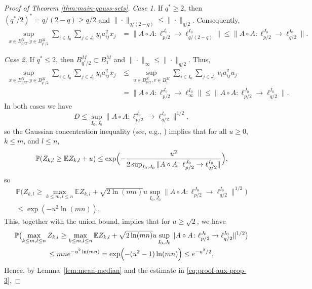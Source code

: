 \documentclass[a4paper]{amsart}
\theoremstyle{definition}
\theoremstyle{remark}
\numberwithin{equation}{section}
\newcommand*{\EE}{\mathbb{E}}
\newcommand*{\PP}{\mathbb{P}}
\newcommand*{\hadprod}{\mathbin{\circ}} %
\begin{document}
\begin{proof}[Proof of Theorem \ref{thm:main-gauss-sets}]
\textit{Case 1.} If $q^*\geq 2$, then $(q^*/2)^* = q/(2-q)\geq q/2$ and $\|\cdot\|_{q/(2-q)} \leq \|\cdot\|_{q/2}$.
Consequently,
\begin{align}	\label{eq:manipulations-to-fix1} 
\sup_{x\in B_{p/2}^N, y\in B_{q^*/2}^M} \sum_{i\in I_0} \sum_{j\in J_0}  y_i a_{ij}^2 x_j
&= 			\|A \hadprod A\colon \ell_{p/2}^{J_0}\to\ell_{q/(2-q)}^{I_0}\|   \leq 	\|A \hadprod A\colon \ell_{p/2}^{J_0}\to\ell_{q/2}^{I_0}\|.
\end{align}

\textit{Case 2.} If $q^*\leq 2$, then $B_{q^*/2}^M \subset B_1^M$ and $\|\cdot\|_{\infty} \leq\|\cdot\|_{q/2}$. Thus,
\begin{align}	\label{eq:manipulations-to-fix2} \nonumber
\sup_{x\in B_{p/2}^N, y\in B_{q^*/2}^M} \sum_{i\in I_0}\sum_{j\in J_0}  y_i a_{ij}^2 x_j
&\leq  		
\sup_{u\in B_{p/2}^N, v\in B_{1}^M} \sum_{i\in I_0} \sum_{j\in J_0}  v_i a_{ij}^2 u_j \\
& = 		\|A \hadprod A\colon \ell_{p/2}^{J_0}\to\ell_{\infty}^{I_0}\|
  \leq 	\|A \hadprod A\colon \ell_{p/2}^{J_0} \to\ell_{q/2}^{I_0}\|.
\end{align}
In both cases we have
\[
D\leq \sup_{I_0, J_0} \|A\hadprod A \colon \ell^{J_0}_{p/2} \to \ell^{I_0}_{q/2}\|^{1/2},
\] so the Gaussian concentration inequality (see, e.g., \cite[Chapter~5.1]{Ledoux}) implies that for all $u\geq 0$, $k\leq m$, and $l \leq n$,
	\begin{align*}
		\PP (Z_{k,l} \ge \EE Z_{k,l} +u)\le \exp\Bigl(-\frac{u^2}{2 \sup_{I_0, J_0} \|A\hadprod A \colon \ell^{J_0}_{p/2} \to \ell^{I_0}_{q/2}\|}\Bigr),
	\end{align*}
	 so
	 	\begin{multline*}
		\PP \bigl(Z_{k,l} \ge\max_{k\leq m, l\leq n} \EE Z_{k,l} + \sqrt{2\ln(mn)} u \sup_{I_0, J_0} \|A\hadprod A \colon \ell^{J_0}_{p/2} \to \ell^{I_0}_{q/2}\|^{1/2}\bigr)\\
		\le \exp(-u^2\ln (mn)).
	\end{multline*}
	This, together with  the union bound, implies that for $u\ge \sqrt 2$, we have
	\begin{multline*}
\PP\bigl(\max_{k\leq m, l\leq n} Z_{k,l} \geq \max_{k\leq m, l\leq n}\EE Z_{k,l} + \sqrt{2\ln(mn)} u \sup_{I_0, J_0} \|A\hadprod A \colon \ell^{J_0}_{p/2} \to \ell^{I_0}_{q/2}\|^{1/2}\bigr)
\\
\le mne^{-u^2\ln(mn)}
 = \exp\Bigl(- (u^2-1)\ln(mn) \Bigr)
 \leq e^{-u^2/2}.
	\end{multline*}
Hence, by Lemma~\ref{lem:mean-median} and the estimate in \eqref{eq:proof-aux-prop-3},

\end{proof}
\end{document}
